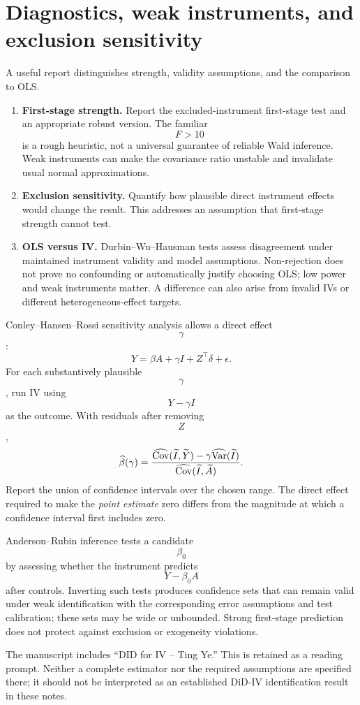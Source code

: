 \section{Diagnostics, weak instruments, and exclusion sensitivity}
A useful report distinguishes strength, validity assumptions, and the comparison to OLS.
\begin{enumerate}
\item \textbf{First-stage strength.} Report the excluded-instrument first-stage test and an appropriate robust version. The familiar $$F>10$$ is a rough heuristic, not a universal guarantee of reliable Wald inference. Weak instruments can make the covariance ratio unstable and invalidate usual normal approximations.
\item \textbf{Exclusion sensitivity.} Quantify how plausible direct instrument effects would change the result. This addresses an assumption that first-stage strength cannot test.
\item \textbf{OLS versus IV.} Durbin--Wu--Hausman tests assess disagreement under maintained instrument validity and model assumptions. Non-rejection does not prove no confounding or automatically justify choosing OLS; low power and weak instruments matter. A difference can also arise from invalid IVs or different heterogeneous-effect targets.
\end{enumerate}

Conley--Hansen--Rossi sensitivity analysis allows a direct effect $$\gamma$$:
\begin{equation}
Y=\beta A+\gamma I+Z^\top\delta+\epsilon.
\end{equation}
For each substantively plausible $$\gamma$$, run IV using $$Y-\gamma I$$ as the outcome. With residuals after removing $$Z$$,
\begin{equation}
\widehat\beta(\gamma)=
\frac{\widehat{\operatorname{Cov}}(\widetilde I,\widetilde Y)-
\gamma\widehat{\operatorname{Var}}(\widetilde I)}
{\widehat{\operatorname{Cov}}(\widetilde I,\widetilde A)}.
\end{equation}
Report the union of confidence intervals over the chosen range. The direct effect required to make the \emph{point estimate} zero differs from the magnitude at which a confidence interval first includes zero.

Anderson--Rubin inference tests a candidate $$\beta_0$$ by assessing whether the instrument predicts $$Y-\beta_0A$$ after controls. Inverting such tests produces confidence sets that can remain valid under weak identification with the corresponding error assumptions and test calibration; these sets may be wide or unbounded. Strong first-stage prediction does not protect against exclusion or exogeneity violations.
\begin{remarkbox}
The manuscript includes ``DID for IV -- Ting Ye.'' This is retained as a reading prompt. Neither a complete estimator nor the required assumptions are specified there; it should not be interpreted as an established DiD-IV identification result in these notes.
\end{remarkbox}

